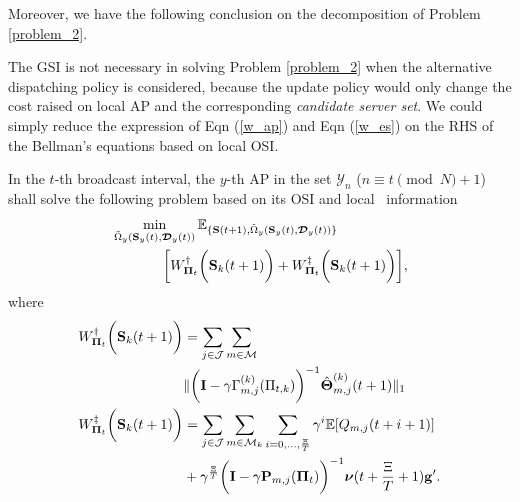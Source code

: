 Moreover, we have the following conclusion on the decomposition of Problem \ref{problem_2}.
\begin{lemma}
    The GSI is not necessary in solving Problem \ref{problem_2} when the alternative dispatching policy is considered, because the update policy would only change the cost raised on local AP and the corresponding \emph{candidate server set}.
    We could simply reduce the expression of Eqn (\ref{w_ap}) and Eqn (\ref{w_es}) on the RHS of the Bellman's equations based on local OSI.
\end{lemma}
\begin{problem}[]
    In the $t$-th broadcast interval, the $y$-th AP in the set $\mathcal{Y}_{n}$ ($n \equiv t \pmod{N} + 1$) shall solve the following problem based on its OSI and local \brlatency~information
    {\small
    \begin{align}
        &\min_{\tilde{\Omega}_{y}(\mathbf{S}_{y}(t),\boldsymbol{\mathcal{D}}_{y}(t))}
        \mathbb{E}_{\{\mathbf{S}(t+1), \tilde{\Omega}_{y}(\mathbf{S}_{y}(t),\boldsymbol{\mathcal{D}}_{y}(t))\}}
        \nonumber\\
        &~~~~~~~~~~~\bigg[
            W^{\dagger}_{ \boldsymbol{\Pi}_{t} }\bigg(\mathbf{S}_{k}(t+1)\bigg) +
            W^{\ddagger}_{ \boldsymbol{\Pi}_{t} }\bigg(\mathbf{S}_{k}(t+1)\bigg)
        \bigg],
        \label{eqn:partial}
    \end{align}
    }
    where
    \begin{align}
        W^{\dagger}_{\boldsymbol{\Pi}_{t}}\bigg(\mathbf{S}_{k}(t+1)\bigg) &= \sum_{j\in\mathcal{J}}\sum_{m\in\mathcal{M}}
        \nonumber\\
        &\lVert
            \bigg( \mathbf{I} - \gamma {\Gamma}^{(k)}_{m,j}(\Pi_{t,k}) \bigg)^{-1} \hat{\boldsymbol{\Theta}}^{(k)}_{m,j}(t+1)
        \|_1
        \\
        W^{\ddagger}_{\boldsymbol{\Pi}_{t}}\bigg(\mathbf{S}_{k}(t+1)\bigg)
        &= \sum_{j\in\mathcal{J}}\sum_{m\in\mathcal{M}_{k}}\sum_{i=0,\dots,\frac{\Xi}{T}} \gamma^{i} \mathbb{E}[ Q_{m,j}({t+i+1}) ]
        \nonumber\\
        &+ \gamma^{\frac{\Xi}{T}} \bigg( \mathbf{I} - \gamma \mathbf{P}_{m,j}(\boldsymbol{\Pi}_{t}) \bigg)^{-1} \boldsymbol{\nu}({t+\frac{\Xi}{T}+1}) \mathbf{g}'.
    \end{align}
    \label{problem_3}
\end{problem}


